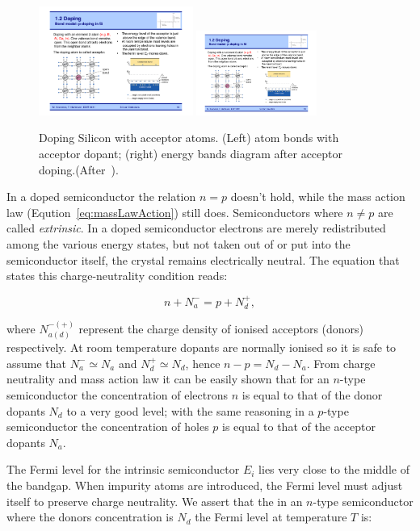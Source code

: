  \begin{figure}[htbp]
   \centering
   \includegraphics[width=0.45\textwidth]{pDopingBonds.pdf} 
   \includegraphics[width=0.35\textwidth]{pDopingBands.pdf} 
   \caption{\label{fig:pDoping}Doping Silicon with acceptor atoms. (Left) atom bonds with acceptor 
   dopant; (right) energy bands diagram after acceptor doping.(After~\cite{Krammer}).}
\end{figure}
In a doped semiconductor the relation $n=p$ doesn't hold, while the mass action law  
(Eqution~\ref{eq:massLawAction}) still does. Semiconductors where $n\neq p$ are called
 {\it extrinsic}.
In a doped semiconductor electrons are merely redistributed among the various energy states, 
but not taken out of or put into the semiconductor itself, the crystal remains electrically neutral. 
The equation that states this charge-neutrality condition reads:

\begin{equation}
n+N_a^-=p+N_d^+,
\label{eq:chargeNeutrality}
\end{equation}

where $N_{a(d)}^{-(+)}$ represent the charge density of ionised acceptors (donors) respectively. 
At room temperature dopants are normally ionised so it is safe to assume that $N_a^-\simeq N_a$ 
and $N_d^+\simeq N_d$, hence $n-p=N_d-N_a$. From charge neutrality and mass action law  
it can be easily shown that for an $n$-type semiconductor the concentration of electrons $n$ is 
equal to that of the donor dopants $N_d$ to a very good level; with the same reasoning in a 
$p$-type semiconductor the concentration of holes $p$ is equal to that of the acceptor 
dopants $N_a$. 

The Fermi level for the intrinsic semiconductor $E_i$ lies very close to the middle of the bandgap.
 When 
impurity atoms are introduced, the Fermi level must adjust itself to preserve charge neutrality. 
We assert that the in an $n$-type semiconductor where the donors concentration is $N_d$ the 
Fermi level at temperature $T$ is:

